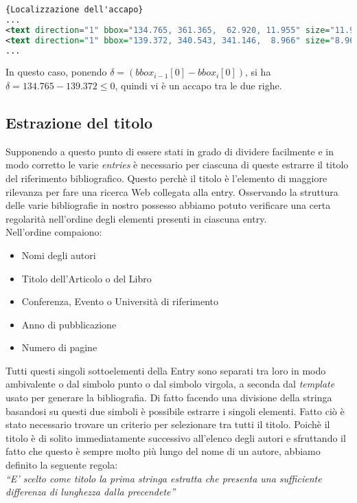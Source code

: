 \begin{lstlisting}[language=XML,frame=r,caption=Esempio di XML in cui si nota l'accapo tra References e la prima voce ,breaklines=true,basicstyle=\small]{Localizzazione dell'accapo}
...
<text direction="1" bbox="134.765, 361.365,  62.920, 11.955" size="11.955">References</text>
<text direction="1" bbox="139.372, 340.543, 341.146,  8.966" size="8.966">1. J.-F. Arias, C.P. Lai, S. Surya, R. Kasturi, and A.K. Chhabra. Interpretation of</text>
...

\end{lstlisting}

In questo caso, ponendo $ \delta  =   (bbox_{i-1}[0] - bbox_{i}[0] ) $, si ha $ \delta  = 134.765 - 139.372 \leq 0$, quindi vi è un accapo tra le due righe.



\subsection{Estrazione del titolo}
Supponendo a questo punto di essere stati in grado di dividere facilmente e in modo corretto le varie \textit{entries} è necessario per ciascuna di queste estrarre il titolo del riferimento bibliografico. Questo perchè il titolo è l'elemento di maggiore rilevanza per fare una ricerca Web collegata alla entry. Osservando la struttura delle varie bibliografie in nostro possesso abbiamo potuto verificare una certa regolarità nell'ordine degli elementi presenti in ciascuna entry.
\\
Nell'ordine compaiono:
\begin{itemize}
 \item Nomi degli autori
 \item Titolo dell'Articolo o del Libro
 \item Conferenza, Evento o Università di riferimento
 \item Anno di pubblicazione
 \item Numero di pagine
\end{itemize}

Tutti questi singoli sottoelementi della Entry sono separati tra loro in modo ambivalente o dal simbolo punto o dal simbolo virgola, a seconda dal \textit{template} usato per generare la bibliografia. Di fatto facendo una divisione della stringa basandosi su questi due simboli è possibile estrarre i singoli elementi. Fatto ciò è stato necessario trovare un criterio per selezionare tra tutti il titolo.
Poichè il titolo è di solito immediatamente successivo all'elenco degli autori e sfruttando il fatto che questo è sempre molto più lungo del nome di un autore, abbiamo definito la seguente regola:
\\
\textit{``E' scelto come titolo la prima stringa estratta che presenta una sufficiente differenza di lunghezza dalla precendete''}
\\

